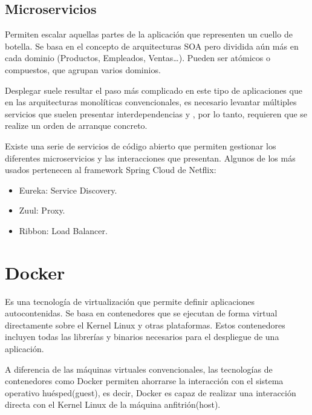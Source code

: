 \subsection{Microservicios}

Permiten escalar aquellas partes de la aplicación que representen un cuello de botella. Se basa en el concepto de arquitecturas SOA pero dividida aún más en cada dominio (Productos, Empleados, Ventas…). Pueden ser atómicos o compuestos, que agrupan varios dominios.

Desplegar suele resultar el paso más complicado en este tipo de aplicaciones que en las arquitecturas monolíticas convencionales, es necesario levantar múltiples servicios que suelen presentar interdependencias y , por lo tanto, requieren que se realize un orden de arranque concreto.

Existe una serie de servicios de código abierto que permiten gestionar los diferentes microservicios y las interacciones que presentan. Algunos de los más usados pertenecen al framework Spring Cloud de Netflix:
\begin{itemize}
\item Eureka: Service Discovery.
\item Zuul: Proxy.
\item Ribbon: Load Balancer.
\end{itemize}



\vspace{1cm}
\section{Docker }
Es una tecnología de virtualización que permite definir aplicaciones autocontenidas. Se basa en contenedores que se ejecutan de forma virtual directamente sobre el Kernel Linux y otras plataformas. Estos contenedores incluyen todas las librerías y binarios necesarios para el despliegue de una aplicación.

A diferencia de las máquinas virtuales convencionales, las tecnologías de contenedores como Docker permiten ahorrarse la interacción con el sistema operativo huésped(guest), es decir, Docker es capaz de realizar una interacción directa con el Kernel Linux de la máquina anfitrión(host).

